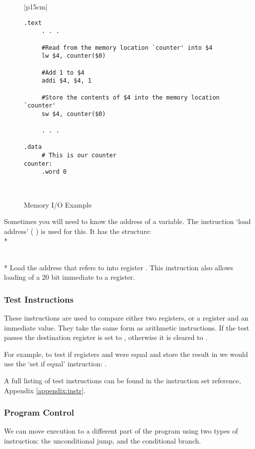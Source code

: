 \begin{figure}[btp]
\begin{center}
\begin{tabular}{|p{15cm}|}
\hline
\begin{verbatim}
.text
     . . .

     #Read from the memory location `counter' into $4
     lw $4, counter($0)

     #Add 1 to $4
     addi $4, $4, 1

     #Store the contents of $4 into the memory location `counter'
     sw $4, counter($0)

     . . .
     
.data
     # This is our counter
counter:
     .word 0 
\end{verbatim}%
\\
\hline
\end{tabular}
\end{center}
\caption{Memory I/O Example}
\label{memio}
\end{figure}

Sometimes you will need to know the address of a variable. The 
instruction `load address' (  ) is used for this. It has the 
structure:
\\*

 \\*
Load the address that  refers to into register \regd.
This instruction also allows loading of a 20 bit immediate to a register.

\subsubsection{Test Instructions}
These instructions are used to compare either two registers, or a
register and an immediate value. They take the same form as
arithmetic instructions. If the test passes the destination register
is set to , otherwise it is cleared to .

For example, to test if registers  and  were equal and store the
result in  we would use the `set if equal' instruction: 
.

A full listing of test instructions can be found in the instruction set reference, Appendix \ref{appendix:instr}.

\subsubsection{Program Control}
We can move execution to a different part of the program using two types
of instruction: the unconditional jump, and the conditional branch.

